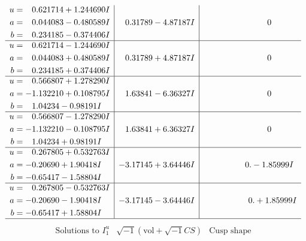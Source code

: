 \documentclass[1p]{elsarticle_modified}
\theoremstyle{definition}
\newcommand{\I}{\sqrt{-1}}
\begin{document}
$$\begin{array}{c|c|c}
\begin{aligned}
u &= \phantom{-}0.621714 + 1.244690 I \\
a &= \phantom{-}0.044083 - 0.480589 I \\
b &= \phantom{-}0.234185 - 0.374406 I\end{aligned}
 & \phantom{-}0.31789 - 4.87187 I & \phantom{-0.000000 } 0 \\ \hline\begin{aligned}
u &= \phantom{-}0.621714 - 1.244690 I \\
a &= \phantom{-}0.044083 + 0.480589 I \\
b &= \phantom{-}0.234185 + 0.374406 I\end{aligned}
 & \phantom{-}0.31789 + 4.87187 I & \phantom{-0.000000 } 0 \\ \hline\begin{aligned}
u &= \phantom{-}0.566807 + 1.278290 I \\
a &= -1.132210 + 0.108795 I \\
b &= \phantom{-}1.04234 - 0.98191 I\end{aligned}
 & \phantom{-}1.63841 - 6.36327 I & \phantom{-0.000000 } 0 \\ \hline\begin{aligned}
u &= \phantom{-}0.566807 - 1.278290 I \\
a &= -1.132210 - 0.108795 I \\
b &= \phantom{-}1.04234 + 0.98191 I\end{aligned}
 & \phantom{-}1.63841 + 6.36327 I & \phantom{-0.000000 } 0 \\ \hline\begin{aligned}
u &= \phantom{-}0.267805 + 0.532763 I \\
a &= -0.20690 + 1.90418 I \\
b &= -0.65417 - 1.58804 I\end{aligned}
 & -3.17145 + 3.64446 I & \phantom{-0.000000 } 0. - 1.85999 I \\ \hline\begin{aligned}
u &= \phantom{-}0.267805 - 0.532763 I \\
a &= -0.20690 - 1.90418 I \\
b &= -0.65417 + 1.58804 I\end{aligned}
 & -3.17145 - 3.64446 I & \phantom{-0.000000 -}0. + 1.85999 I\\
 \hline 
 \end{array}$$\newpage$$\begin{array}{c|c|c}  
\text{Solutions to }I^u_{1}& \I (\text{vol} + \sqrt{-1}CS) & \text{Cusp shape}\\

\end{array}$$
\end{document}
